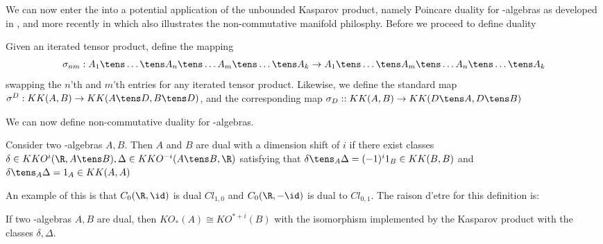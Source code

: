 We can now enter the into a potential application of the unbounded Kasparov product, namely Poincare duality for \Cstar-algebras as developed in \cite{kasparov2} \cite{connes1} \cite{connes2}, and more recently in \cite{rennie2} which also illustrates the non-commutative manifold philosphy.
Before we proceed to define duality 
\begin{definition}
Given an iterated tensor product, define the mapping 
\begin{align*}
	\sigma_{nm}:A_1\tens \dots \tens  A_n \tens \dots A_m \tens \dots \tens A_k\to  A_1\tens \dots \tens  A_m \tens \dots A_n \tens \dots \tens A_k
\end{align*}
swapping the $n$'th and $m$'th entries for any iterated tensor product. Likewise, we define the standard map $\sigma^D:KK(A,B)\to KK(A\tens D,B\tens D)$, and the corresponding map $\sigma_D::KK(A,B)\to KK(D\tens A,D\tens B)$
\end{definition}
We can now define non-commutative duality for \Cstar-algebras. 
\begin{definition}
	Consider two \Cstar-algebras $A,B$. Then $A$ and $B$ are dual with a dimension shift of $i$ if there exist classes $\delta \in KKO^i(\R,A\tens B),\Delta \in KKO^{-i}(A\tens B,\R)$ satisfying that $\delta \tens_A \Delta=(-1)^{i} 1_B\in KK(B,B)$ and $\delta \tens_A \Delta=1_A \in KK(A,A)$ 
\end{definition}
An example of this is that $C_0(\R,\id)$ is dual $Cl_{1,0}$ and $C_0(\R,-\id)$ is dual to $Cl_{0,1}$.
The raison d'etre for this definition is:
\begin{proposition}
	If two \Cstar-algebras $A,B$ are dual, then $KO_*(A)\cong KO^{*+i}(B)$ with the isomorphism implemented by the Kasparov product with the classes $\delta,\Delta$. 
\end{proposition}
